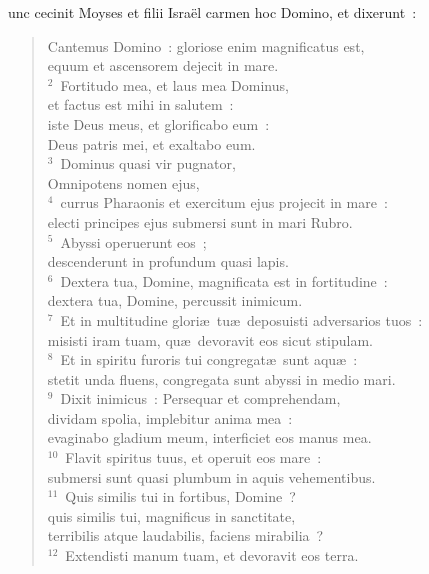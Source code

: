 \bchapter
{}unc cecinit Moyses et filii Isra\"el carmen hoc Domino, et dixerunt~: \begin{flushleft}\begin{verse}\vspace{6pt}Cantemus Domino~: gloriose enim magnificatus est,\\ equum et ascensorem dejecit in mare.\\
${}^{2}$~Fortitudo mea, et laus mea Dominus,\\ et factus est mihi in salutem~:\\ iste Deus meus, et glorificabo eum~:\\ Deus patris mei, et exaltabo eum.\\
${}^{3}$~Dominus quasi vir pugnator,\\ Omnipotens nomen ejus,\\
${}^{4}$~currus Pharaonis et exercitum ejus projecit in mare~:\\ electi principes ejus submersi sunt in mari Rubro.\\
${}^{5}$~Abyssi operuerunt eos~;\\ descenderunt in profundum quasi lapis.\\
${}^{6}$~Dextera tua, Domine, magnificata est in fortitudine~:\\ dextera tua, Domine, percussit inimicum.\\
${}^{7}$~Et in multitudine glori\ae\ tu\ae\ deposuisti adversarios tuos~:\\ misisti iram tuam, qu\ae\ devoravit eos sicut stipulam.\\
${}^{8}$~Et in spiritu furoris tui congregat\ae\ sunt aqu\ae~:\\ stetit unda fluens, congregata sunt abyssi in medio mari.\\
${}^{9}$~Dixit inimicus~: Persequar et comprehendam,\\ dividam spolia, implebitur anima mea~:\\ evaginabo gladium meum, interficiet eos manus mea.\\
${}^{10}$~Flavit spiritus tuus, et operuit eos mare~:\\ submersi sunt quasi plumbum in aquis vehementibus.\\
${}^{11}$~Quis similis tui in fortibus, Domine~?\\ quis similis tui, magnificus in sanctitate,\\ terribilis atque laudabilis, faciens mirabilia~?\\
${}^{12}$~Extendisti manum tuam, et devoravit eos terra.\\

\end{verse}
\end{flushleft}
